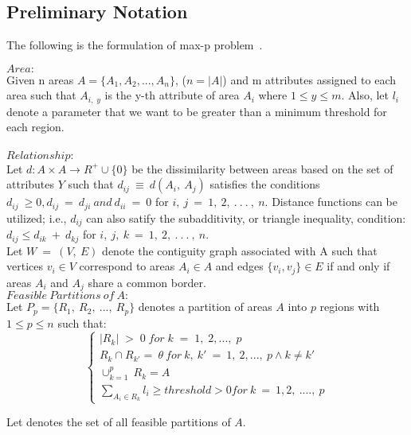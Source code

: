 \documentclass[conference]{IEEEtran}
\begin{document}
\subsection{Preliminary Notation}
The following is the formulation of max-p problem~\cite{r1}.

$Area:$\\
Given n areas $A = \{A_1, A_2, ..., A_n\}$, ($n = |A|$) and m attributes
assigned to each area such that $A_{i,\;y}$ is the y-th attribute of area $A_i$
where $1 \le y \le m$. Also, let $l_i$ denote a parameter that we want to be greater than a minimum
threshold for each region.\\ \\ $Relationship:$\\ Let $d : A \times A \rightarrow R^+ \cup
\{0\}$ be the dissimilarity between areas based on the set of attributes $Y$
such that $d_{ij}\ \equiv \ d(A_i,\ A_j)$ satisfies the conditions $d_{ij}\ \geq
0, d_{ij}\ =\ d_{ji}\ and\ d_{ii}\ =\ 0$ for $i,\ j\ =\ 1,\ 2,\ .\ .\ .\ ,\ n.$
Distance functions can be utilized; i.e., $d_{ij}$ can also satify the
subadditivity, or triangle inequality, condition: $d_{ij} \leq d_{ik}\ +\
d_{kj}$ for $i,\ j,\ k\ =\ 1,\ 2,\ .\ .\ .\ ,\ n.$\\ Let $W\ =\ (V,\ E)$ denote
the contiguity graph associated with A such that vertices $v_i \in V$ correspond
to areas $A_i \in A$ and edges $\{v_i, v_j\} \in E$ if and only if areas $A_i$
and $A_j$ share a common border. \\
 
$Feasible\ Partitions\ of\ A:$\\
Let $P_p = \{R_1,\ R_2,\ ...,\ R_p\}$ denotes a partition of areas $A$ into $p$ regions with $1 \leq p \leq n$ such that:\\
\begin{equation}
\begin{cases}
|R_k|\; >\; 0\; for\; k\; =\;1,\; 2, ...,\;p \\
R_k \cap R_{k'}=\ \theta\ for\ k,\ k'\ =\ 1,\ 2, ...,\ p \wedge k \neq k' \\
\cup_{k=1}^p\ R_k = A\\
\sum_{A_i \in R_k} l_i \geq threshold > 0 for\ k\ =\ 1,2,\ ....,\ p
\end{cases}
\end{equation}

\newcommand{\RNum}[1]{\uppercase\expandafter{\romannumeral #1\relax}}
Let \RNum{2} denotes the set of all feasible partitions of $A$.\\
 \\
\end{document}
